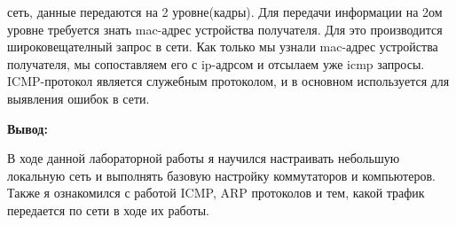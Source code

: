 \documentclass[a4paper,14pt]{extarticle}
\begin{document}
    сеть, данные передаются на 2 уровне(кадры). Для передачи информации на 2ом
    уровне требуется знать mac-адрес устройства получателя. Для это производится
    широковещателный запрос в сети. Как только мы узнали mac-адрес устройства
    получателя, мы сопоставляем его с ip-адрсом и отсылаем уже icmp запросы.
    ICMP-протокол является служебным протоколом, и в основном используется для
    выявления ошибок в сети.\\\par
    \textbf{Вывод:}\par 
    В ходе данной лабораторной работы я научился настраивать небольшую 
    локальную сеть и выполнять базовую настройку коммутаторов и компьютеров.
    Также я ознакомился с работой ICMP, ARP протоколов и тем, какой трафик
    передается по сети в ходе их работы.
\end{document}
